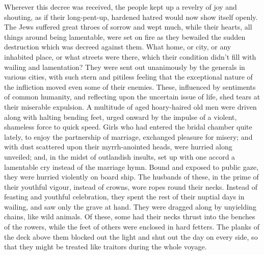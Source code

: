  Wherever this decree was received, the people kept up a
revelry of joy and shouting, as if their long-pent-up, hardened hatred
would now show itself openly.  The Jews suffered great
throes of sorrow and wept much, while their hearts, all things around
being lamentable, were set on fire as they bewailed the sudden
destruction which was decreed against them.  What home, or
city, or any inhabited place, or what streets were there, which their
condition didn't fill with wailing and lamentation?  They
were sent out unanimously by the generals in various cities, with such
stern and pitiless feeling that the exceptional nature of the infliction
moved even some of their enemies. These, influenced by sentiments of
common humanity, and reflecting upon the uncertain issue of life, shed
tears at their miserable expulsion.  A multitude of aged
hoary-haired old men were driven along with halting bending feet, urged
onward by the impulse of a violent, shameless force to quick speed.
 Girls who had entered the bridal chamber quite lately, to
enjoy the partnership of marriage, exchanged pleasure for misery; and
with dust scattered upon their myrrh-anointed heads, were hurried along
unveiled; and, in the midst of outlandish insults, set up with one
accord a lamentable cry instead of the marriage hymn.  Bound
and exposed to public gaze, they were hurried violently on board ship.
 The husbands of these, in the prime of their youthful
vigour, instead of crowns, wore ropes round their necks. Instead of
feasting and youthful celebration, they spent the rest of their nuptial
days in wailing, and saw only the grave at hand.  They were
dragged along by unyielding chains, like wild animals. Of these, some
had their necks thrust into the benches of the rowers, while the feet of
others were enclosed in hard fetters.  The planks of the
deck above them blocked out the light and shut out the day on every
side, so that they might be treated like traitors during the whole
voyage.

